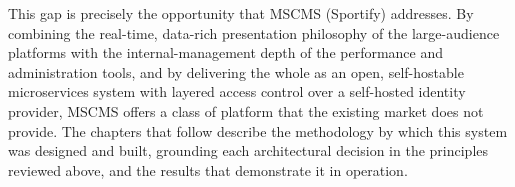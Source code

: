 This gap is precisely the opportunity that MSCMS (Sportify) addresses. By combining the
real-time, data-rich presentation philosophy of the large-audience platforms with the
internal-management depth of the performance and administration tools, and by delivering
the whole as an open, self-hostable microservices system with layered access control over a
self-hosted identity provider, MSCMS offers a class of platform that the existing market does
not provide. The chapters that follow describe the methodology by which this system was
designed and built, grounding each architectural decision in the principles reviewed above,
and the results that demonstrate it in operation.
